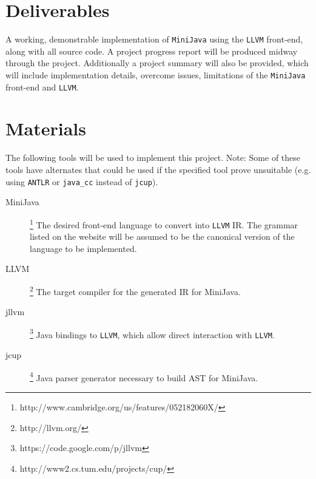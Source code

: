 \documentclass[11pt]{article}
\begin{document}
\section*{Deliverables}
A working, demonstrable implementation of \texttt{MiniJava} using the \texttt{LLVM} front-end, along with all source code. A project progress report will be produced midway through the project. Additionally a project summary will also be provided, which will include implementation details, overcome issues, limitations of the \texttt{MiniJava} front-end and \texttt{LLVM}.

\section*{Materials}
The following tools will be used to implement this project. Note: Some of these tools have alternates that could be used if the specified tool prove unsuitable (e.g. using \texttt{ANTLR} or \texttt{java\_cc} instead of \texttt{jcup}).

\begin{description}
\item[MiniJava]\footnote{http://www.cambridge.org/us/features/052182060X/}
	The desired front-end language to convert into \texttt{LLVM} IR. The grammar listed on the website will be assumed to be the canonical version of the language to be implemented.

\item[LLVM]\footnote{http://llvm.org/} The target compiler for the generated IR for MiniJava.

\item[jllvm]\footnote{https://code.google.com/p/jllvm}
Java bindings to \texttt{LLVM}, which allow direct interaction with \texttt{LLVM}.

\item[jcup]\footnote{http://www2.cs.tum.edu/projects/cup/}
Java parser generator necessary to build AST for MiniJava.

\end{description}
\end{document}
